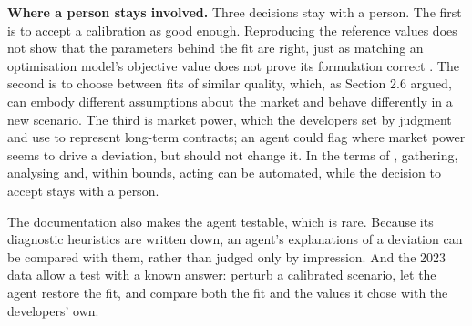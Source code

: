\textbf{Where a person stays involved.} Three decisions stay with a person.
The first is to accept a calibration as good enough.
Reproducing the reference values does not show that the parameters behind the fit are right, just as matching an optimisation model's objective value does not prove its formulation correct \citep{li2026optargus}.
The second is to choose between fits of similar quality, which, as Section 2.6 argued, can embody different assumptions about the market and behave differently in a new scenario.
The third is market power, which the developers set by judgment and use to represent long-term contracts; an agent could flag where market power seems to drive a deviation, but should not change it.
In the terms of \citet{parasuraman2000model}, gathering, analysing and, within bounds, acting can be automated, while the decision to accept stays with a person.

The documentation also makes the agent testable, which is rare.
Because its diagnostic heuristics are written down, an agent's explanations of a deviation can be compared with them, rather than judged only by impression.
And the 2023 data allow a test with a known answer: perturb a calibrated scenario, let the agent restore the fit, and compare both the fit and the values it chose with the developers' own.
